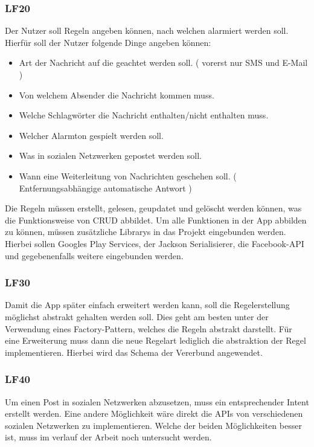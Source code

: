 \subsubsection{LF20}
Der Nutzer soll Regeln angeben k\"onnen, nach welchen alarmiert werden soll. Hierf\"ur soll der Nutzer folgende Dinge angeben k\"onnen:
\begin{itemize}
 \item Art der Nachricht auf die geachtet werden soll. ( vorerst nur SMS und E-Mail )
 \item Von welchem Absender die Nachricht kommen muss.
 \item Welche Schlagw\"orter die Nachricht enthalten/nicht enthalten muss.
 \item Welcher Alarmton gespielt werden soll.
 \item Was in sozialen Netzwerken gepostet werden soll.
 \item Wann eine Weiterleitung von Nachrichten geschehen soll. ( Entfernungsabh\"angige automatische Antwort )
\end{itemize}

Die Regeln m\"ussen erstellt, gelesen, geupdatet und gel\"oscht werden k\"onnen, was die Funktionsweise von CRUD abbildet.
Um alle Funktionen in der App abbilden zu k\"onnen, m\"ussen zus\"atzliche Librarys in das Projekt eingebunden werden. Hierbei sollen Googles Play Services, der Jackson Serialisierer, die Facebook-\ac{API} und gegebenenfalls weitere eingebunden werden.

\subsubsection{LF30}
Damit die App sp\"ater einfach erweitert werden kann, soll die Regelerstellung m\"oglichst abstrakt gehalten werden soll. Dies geht am besten unter der Verwendung eines Factory-Pattern, welches die Regeln abstrakt darstellt. F\"ur eine Erweiterung muss dann die neue Regelart lediglich die abstraktion der Regel implementieren. Hierbei wird das Schema der Vererbund angewendet.

\subsubsection{LF40}
Um einen Post in sozialen Netzwerken abzusetzen, muss ein entsprechender Intent erstellt werden. Eine andere M\"oglichkeit w\"are direkt die APIs von verschiedenen sozialen Netzwerken zu implementieren. Welche der beiden M\"oglichkeiten besser ist, muss im verlauf der Arbeit noch untersucht werden.

